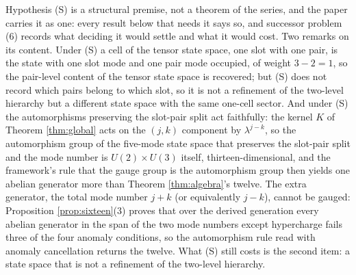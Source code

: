 \documentclass[11pt]{article}
\theoremstyle{definition}
\begin{document}
Hypothesis (S) is a structural premise, not a theorem of the series, and the paper carries it as one: every result below that needs it says so, and successor problem (6) records what deciding it would settle and what it would cost. Two remarks on its content. Under (S) a cell of the tensor state space, one slot with one pair, is the state with one slot mode and one pair mode occupied, of weight $3 - 2 = 1$, so the pair-level content of the tensor state space is recovered; but (S) does not record which pairs belong to which slot, so it is not a refinement of the two-level hierarchy but a different state space with the same one-cell sector. And under (S) the automorphisms preserving the slot-pair split act faithfully: the kernel $K$ of Theorem \ref{thm:global} acts on the $(j, k)$ component by $\lambda^{j - k}$, so the automorphism group of the five-mode state space that preserves the slot-pair split and the mode number is $U(2) \times U(3)$ itself, thirteen-dimensional, and the framework's rule that the gauge group is the automorphism group then yields one abelian generator more than Theorem \ref{thm:algebra}'s twelve. The extra generator, the total mode number $j + k$ (or equivalently $j - k$), cannot be gauged: Proposition \ref{prop:sixteen}(3) proves that over the derived generation every abelian generator in the span of the two mode numbers except hypercharge fails three of the four anomaly conditions, so the automorphism rule read with anomaly cancellation returns the twelve. What (S) still costs is the second item: a state space that is not a refinement of the two-level hierarchy.
\end{document}
